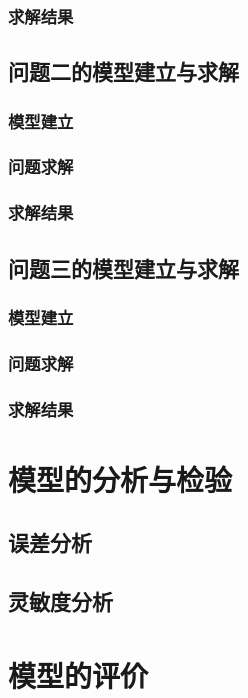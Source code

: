 \documentclass[withoutpreface,bwprint]{cumcmthesis} %
\begin{document}
\subsubsection{求解结果}

\subsection{问题二的模型建立与求解}
\subsubsection{模型建立}
\subsubsection{问题求解}
\subsubsection{求解结果}

\subsection{问题三的模型建立与求解}
\subsubsection{模型建立}
\subsubsection{问题求解}
\subsubsection{求解结果}

\section{模型的分析与检验}
\subsection{误差分析}
\subsection{灵敏度分析}


\section{模型的评价}
\end{document}
